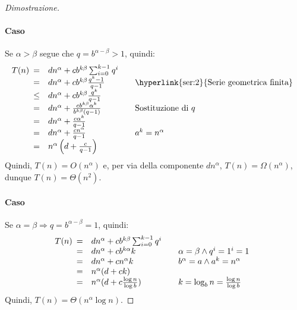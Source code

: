 \begin{proof}[Dimostrazione]
    \paragraph{Caso \bm{$\alpha>\beta$}}
    Se $\alpha>\beta$ segue che $q=b^{\alpha-\beta}>1$, quindi:
    \[T(n)\begin{array}[t]{cll}
        = & dn^\alpha+cb^{k\beta}\sum_{i=0}^{k-1}q^i\\
        = & dn^\alpha+cb^{k\beta}\frac{q^k-1}{q-1} & \quad\text{\hyperlink{ser:2}{Serie geometrica finita}}\\
        \leq & dn^\alpha+cb^{k\beta}\frac{q^k}{q-1}\\
        = & dn^\alpha+\frac{cb^{k\beta}\alpha^k}{b^{k\beta}(q-1)} & \quad\text{Sostituzione di $q$}\\
        = & dn^\alpha+\frac{c\alpha^k}{q-1}\\
        = & dn^\alpha+\frac{cn^\alpha}{q-1} & \quad a^k=n^\alpha\\
        = & n^\alpha\left(d+\frac{c}{q-1}\right)
    \end{array}\]
    Quindi, $T(n)=O(n^\alpha)$ e, per via della componente $dn^\alpha$,
    $T(n)=\Omega(n^\alpha)$, dunque $T(n)=\Theta(n^2)$.

    \paragraph{Caso \bm{$\alpha=\beta$}}
    Se $\alpha=\beta\Rightarrow q=b^{\alpha-\beta}=1$, quindi:
    \[T(n)\begin{array}[t]{cll}
        = & dn^\alpha+cb^{k\beta}\sum_{i=0}^{k-1}q^i\\
        = & dn^\alpha+cb^{k\alpha}k & \quad\alpha=\beta\wedge q^i=1^i=1\\
        = & dn^\alpha+cn^\alpha k & \quad b^\alpha=a\wedge a^k=n^\alpha\\
        = & n^\alpha(d+ck)\\
        = & n^\alpha(d+c\frac{\log n}{\log b}) & \quad k=\log_b n=\frac{\log n}{\log b}
    \end{array}\]
    Quindi, $T(n)=\Theta(n^\alpha\log n)$.


\end{proof}
